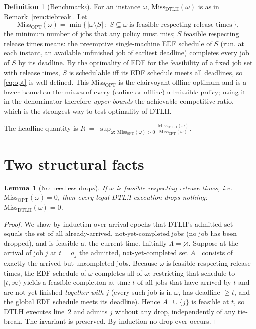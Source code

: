 \documentclass{amsart}
\newtheorem{lemma}[theorem]{Lemma}
\theoremstyle{definition}
\newtheorem{definition}[theorem]{Definition}
\begin{document}
\begin{definition}[Benchmarks]
For an instance $\omega$, $\mathrm{Miss}_{\mathrm{DTLH}}(\omega)$ is as in
Remark~\ref{rem:tiebreak}. Let
\begin{equation}\label{eq:opt}
\mathrm{Miss}_{\mathrm{OPT}}(\omega)
=\min\Big\{\,|\omega\setminus S|\ :\ S\subseteq\omega \text{ is feasible respecting release times}\,\Big\},
\end{equation}
the minimum number of jobs that any policy must miss; $S$ feasible respecting
release times means: the preemptive single-machine EDF schedule of $S$ (run, at
each instant, an available unfinished job of earliest deadline) completes every
job of $S$ by its deadline. By the optimality of EDF for the feasibility of a
fixed job set with release times, $S$ is schedulable iff its EDF schedule meets
all deadlines, so \eqref{eq:opt} is well defined. This
$\mathrm{Miss}_{\mathrm{OPT}}$ is the clairvoyant offline optimum and is a lower
bound on the misses of every (online or offline) admissible policy; using it in
the denominator therefore \emph{upper-bounds} the achievable competitive ratio,
which is the strongest way to test optimality of DTLH.
\end{definition}

The headline quantity is
\(
R \;=\; \sup_{\omega:\ \mathrm{Miss}_{\mathrm{OPT}}(\omega)>0}
\frac{\mathrm{Miss}_{\mathrm{DTLH}}(\omega)}{\mathrm{Miss}_{\mathrm{OPT}}(\omega)} .
\)

\section{Two structural facts}

\begin{lemma}[No needless drops]\label{lem:nowaste}
If $\omega$ is feasible respecting release times, i.e.\
$\mathrm{Miss}_{\mathrm{OPT}}(\omega)=0$, then \emph{every} legal DTLH execution
drops nothing: $\mathrm{Miss}_{\mathrm{DTLH}}(\omega)=0$.
\end{lemma}

\begin{proof}
We show by induction over arrival epochs that DTLH's admitted set equals the set
of all already-arrived, not-yet-completed jobs (no job has been dropped), and is
feasible at the current time. Initially $A=\varnothing$. Suppose at the arrival
of job $j$ at $t=a_j$ the admitted, not-yet-completed set $A^-$ consists of
exactly the arrived-but-uncompleted jobs. Because $\omega$ is feasible
respecting release times, the EDF schedule of $\omega$ completes all of $\omega$;
restricting that schedule to $[t,\infty)$ yields a feasible completion at time
$t$ of all jobs that have arrived by $t$ and are not yet finished \emph{together
with} $j$ (every such job is in $\omega$, has deadline $\ge t$, and the global
EDF schedule meets its deadline). Hence $A^-\cup\{j\}$ is feasible at $t$, so
DTLH executes line~2 and admits $j$ without any drop, independently of any
tie-break. The invariant is preserved. By induction no drop ever occurs.
\end{proof}
\end{document}
